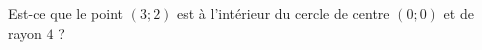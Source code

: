 
\begin{exercice}\label{exosmath-0475}

    Est-ce que le point \( (3;2)\) est à l'intérieur du cercle de centre \( (0;0)\) et de rayon \( 4\) ?

\end{exercice}

